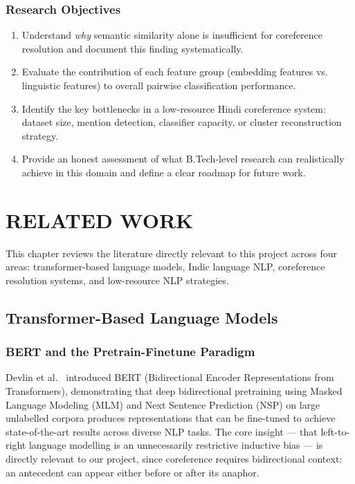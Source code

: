 \documentclass[12pt,a4paper]{report}
\begin{document}
\subsection{Research Objectives}

\begin{enumerate}
    \item Understand \textit{why} semantic similarity alone is insufficient for coreference resolution and document this finding systematically.
    \item Evaluate the contribution of each feature group (embedding features vs. linguistic features) to overall pairwise classification performance.
    \item Identify the key bottlenecks in a low-resource Hindi coreference system: dataset size, mention detection, classifier capacity, or cluster reconstruction strategy.
    \item Provide an honest assessment of what B.Tech-level research can realistically achieve in this domain and define a clear roadmap for future work.
\end{enumerate}


\chapter{RELATED WORK}

This chapter reviews the literature directly relevant to this project across four areas: transformer-based language models, Indic language NLP, coreference resolution systems, and low-resource NLP strategies.

\section{Transformer-Based Language Models}

\subsection{BERT and the Pretrain-Finetune Paradigm}

Devlin et al.\ \cite{devlin2018bert} introduced BERT (Bidirectional Encoder Representations from Transformers), demonstrating that deep bidirectional pretraining using Masked Language Modeling (MLM) and Next Sentence Prediction (NSP) on large unlabelled corpora produces representations that can be fine-tuned to achieve state-of-the-art results across diverse NLP tasks. The core insight --- that left-to-right language modelling is an unnecessarily restrictive inductive bias --- is directly relevant to our project, since coreference requires bidirectional context: an antecedent can appear either before or after its anaphor.
\end{document}
